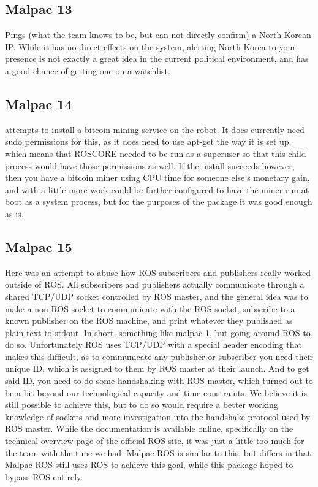 \documentclass[IEEEtran,letterpaper,10pt,notitlepage,draftclsnofoot,onecolumn]{article}
\begin{document}
\subsection{Malpac 13}
Pings (what the team knows to be, but can not directly confirm) a North Korean IP. While it has no direct effects on the system,
alerting North Korea to your presence is not exactly a great idea in the current political environment, and has a good chance
of getting one on a watchlist. 

\subsection{Malpac 14}
attempts to install a bitcoin mining service on the robot.
It does currently need sudo permissions for this, as it does need to use apt-get the way it is set up, which means that ROSCORE needed to be run as a superuser so that this child process would have those permissions as well.
If the install succeeds however, then you have a bitcoin miner using CPU time for someone else’s monetary gain, and with a little more work could be further configured to have the miner run at boot as a system process, but for the purposes of the package it was good enough as is.

\subsection{Malpac 15}
Here was an attempt to abuse how ROS subscribers and publishers really worked outside of ROS.
All subscribers and publishers actually communicate through a shared TCP/UDP socket controlled by ROS master, and the general idea was to make a non-ROS socket to communicate with the ROS socket, subscribe to a known publisher on the ROS machine, and print whatever they published as plain text to stdout.
In short, something like malpac 1, but going around ROS to do so. Unfortunately ROS uses TCP/UDP with a special header encoding that makes this difficult, as to communicate any publisher or subscriber you need their unique ID, which is assigned to them by ROS master at their launch.
And to get said ID, you need to do some handshaking with ROS master, which turned out to be a bit beyond our technological capacity and time constraints.
We believe it is still possible to achieve this, but to do so would require a better working knowledge of sockets and more investigation into the handshake protocol used by ROS master.
While the documentation is available online, specifically on the technical overview page of the official ROS site\cite{ROS}, it was just a little too much for the team with the time we had.
Malpac ROS is similar to this, but differs in that Malpac ROS still uses ROS to achieve this goal, while this package hoped to 
bypass ROS entirely.
\end{document}
